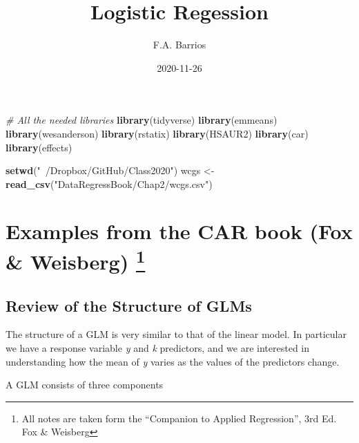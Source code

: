 \documentclass[
]{article}
\title{Logistic Regession}
\author{F.A. Barrios}
\date{2020-11-26}
\newenvironment{Shaded}{\begin{snugshade}}{\end{snugshade}}
\newcommand{\CommentTok}[1]{\textcolor[rgb]{0.56,0.35,0.01}{\textit{#1}}}
\newcommand{\KeywordTok}[1]{\textcolor[rgb]{0.13,0.29,0.53}{\textbf{#1}}}
\newcommand{\NormalTok}[1]{#1}
\newcommand{\StringTok}[1]{\textcolor[rgb]{0.31,0.60,0.02}{#1}}
\begin{document}
\maketitle

\begin{Shaded}
\begin{Highlighting}[]
\CommentTok{# All the needed libraries}
\KeywordTok{library}\NormalTok{(tidyverse)}
\KeywordTok{library}\NormalTok{(emmeans)}
\KeywordTok{library}\NormalTok{(wesanderson)}
\KeywordTok{library}\NormalTok{(rstatix)}
\KeywordTok{library}\NormalTok{(HSAUR2)}
\KeywordTok{library}\NormalTok{(car)}
\KeywordTok{library}\NormalTok{(effects)}

\KeywordTok{setwd}\NormalTok{(}\StringTok{"~/Dropbox/GitHub/Class2020"}\NormalTok{)}
\NormalTok{wcgs <-}\StringTok{ }\KeywordTok{read_csv}\NormalTok{(}\StringTok{"DataRegressBook/Chap2/wcgs.csv"}\NormalTok{)}
\end{Highlighting}
\end{Shaded}

\hypertarget{examples-from-the-car-book-fox-weisberg-1}{%
\section[Examples from the CAR book (Fox \& Weisberg)
]{\texorpdfstring{Examples from the CAR book (Fox \& Weisberg)
\footnote{All notes are taken form the ``Companion to Applied
  Regression'', 3rd Ed. Fox \& Weisberg}}{Examples from the CAR book (Fox \& Weisberg) }}\label{examples-from-the-car-book-fox-weisberg-1}}

\hypertarget{review-of-the-structure-of-glms}{%
\subsection{Review of the Structure of
GLMs}\label{review-of-the-structure-of-glms}}

The structure of a GLM is very similar to that of the linear model. In
particular we have a response variable \emph{y} and \emph{k} predictors,
and we are interested in understanding how the mean of \emph{y} varies
as the values of the predictors change.

A GLM consists of three components
\end{document}
